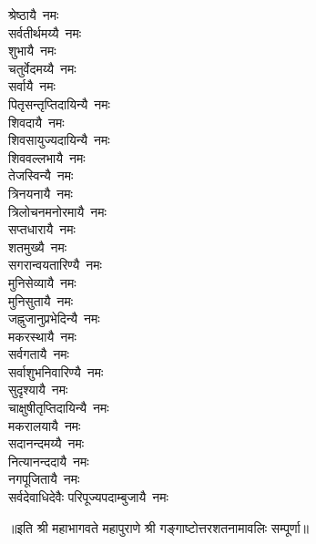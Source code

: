 \begin{multicols}{2}
\begin{flushleft}
श्रेष्ठायै~नमः\\
सर्वतीर्थमय्यै~नमः\\
शुभायै~नमः\\
चतुर्वेदमय्यै~नमः\\
सर्वायै~नमः\\
पितृसन्तृप्तिदायिन्यै~नमः\\
शिवदायै~नमः\\
शिवसायुज्यदायिन्यै~नमः\\
शिववल्लभायै~नमः\\
तेजस्विन्यै~नमः\hfill{}\\
त्रिनयनायै~नमः\\
त्रिलोचनमनोरमायै~नमः\\
सप्तधारायै~नमः\\
शतमुख्यै~नमः\\
सगरान्वयतारिण्यै~नमः\\
मुनिसेव्यायै~नमः\\
मुनिसुतायै~नमः\\
जह्नुजानुप्रभेदिन्यै~नमः\\
मकरस्थायै~नमः\\
सर्वगतायै~नमः\hfill{}\\
सर्वाशुभनिवारिण्यै~नमः\\
सुदृश्यायै~नमः\\
चाक्षुषीतृप्तिदायिन्यै~नमः\\
मकरालयायै~नमः\\
सदानन्दमय्यै~नमः\\
नित्यानन्ददायै~नमः\\
नगपूजितायै~नमः\\
सर्वदेवाधिदेवैः परिपूज्यपदाम्बुजायै~नमः\\
\end{flushleft}
\end{multicols}
॥इति श्री महाभागवते महापुराणे श्री गङ्गाष्टोत्तरशतनामावलिः सम्पूर्णा॥
